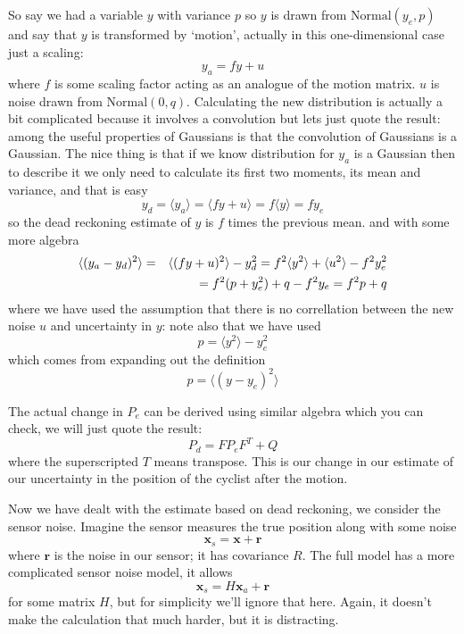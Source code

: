 \documentclass[12pt]{article}
\begin{document}
So say we had a variable $y$ with variance $p$ so $y$ is
drawn from $\text{Normal}(y_e,p)$ and say that $y$ is transformed by `motion', actually in this one-dimensional case just a scaling:
\begin{equation}
y_a=fy+u
\end{equation}
where $f$ is some scaling factor acting as an analogue of the motion
matrix. $u$ is noise drawn from $\text{Normal}(0,q)$. Calculating the
new distribution is actually a bit complicated because it involves a
convolution but lets just quote the result: among the useful
properties of Gaussians is that the convolution of Gaussians is a
Gaussian. The nice thing is that if we know distribution for $y_a$ is
a Gaussian then to describe it we only need to calculate its first two
moments, its mean and variance, and that is easy
\begin{equation}
y_d=\langle y_a\rangle =\langle fy+u\rangle=f\langle y\rangle=fy_e
\end{equation}
so the dead reckoning estimate of $y$ is $f$ times the previous mean.
and with some more algebra
\begin{eqnarray}
\langle (y_a-y_d)^2\rangle &=&\langle (fy+u)^2 \rangle-y_d^2=f^2\langle y^2\rangle+\langle u^2\rangle -f^2y_e^2\cr
&&=f^2(p+y_e^2)+q-f^2y_e=f^2p+q
\end{eqnarray}
where we have used the assumption that there is no correllation
between the new noise $u$ and uncertainty in $y$: note also that we have used
\begin{equation}
  p=\langle y^2\rangle -y_e^2
\end{equation}
which comes from expanding out the definition
\begin{equation}
  p=\langle (y-y_e)^2\rangle
\end{equation}

The actual change in $P_e$ can be derived using similar algebra which
you can check, we will just quote the result:
\begin{equation}
P_d=FP_eF^T+Q
\end{equation}
where the superscripted $T$ means transpose. This is our change in our
estimate of our uncertainty in the position of the cyclist after the
motion.

Now we have dealt with the estimate based on dead reckoning, we
consider the sensor noise. Imagine the sensor measures the true
position along with some noise
\begin{equation}
\mathbf{x}_s=\mathbf{x}+\mathbf{r}
\end{equation}
where $\mathbf{r}$ is the noise in our sensor; it has covariance $R$. The full model has a more complicated sensor noise model, it allows
\begin{equation}
\mathbf{x}_s=H\mathbf{x}_a+\mathbf{r}
\end{equation}
for some matrix $H$, but for simplicity we'll ignore that here. Again,
it doesn't make the calculation that much harder, but it is distracting.
\end{document}
